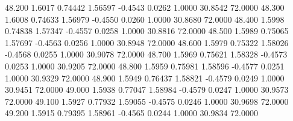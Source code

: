   48.200   1.6017   0.74442   1.56597  -0.4543   0.0262   1.0000  30.8542  72.0000
  48.300   1.6008   0.74633   1.56979  -0.4550   0.0260   1.0000  30.8680  72.0000
  48.400   1.5998   0.74838   1.57347  -0.4557   0.0258   1.0000  30.8816  72.0000
  48.500   1.5989   0.75065   1.57697  -0.4563   0.0256   1.0000  30.8948  72.0000
  48.600   1.5979   0.75322   1.58026  -0.4568   0.0255   1.0000  30.9078  72.0000
  48.700   1.5969   0.75621   1.58328  -0.4573   0.0253   1.0000  30.9205  72.0000
  48.800   1.5959   0.75981   1.58596  -0.4577   0.0251   1.0000  30.9329  72.0000
  48.900   1.5949   0.76437   1.58821  -0.4579   0.0249   1.0000  30.9451  72.0000
  49.000   1.5938   0.77047   1.58984  -0.4579   0.0247   1.0000  30.9573  72.0000
  49.100   1.5927   0.77932   1.59055  -0.4575   0.0246   1.0000  30.9698  72.0000
  49.200   1.5915   0.79395   1.58961  -0.4565   0.0244   1.0000  30.9834  72.0000
